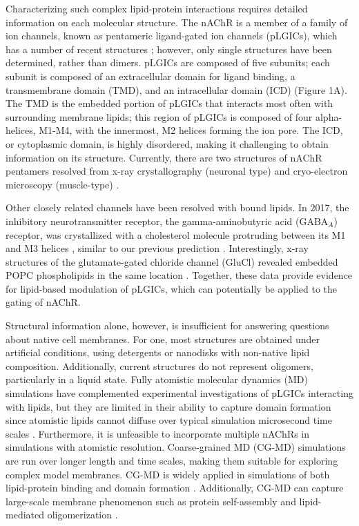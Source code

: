 Characterizing such complex lipid-protein interactions requires detailed information on each molecular structure. The nAChR is a member of a family of ion channels, known as pentameric ligand-gated ion channels (pLGICs), which has a number of recent structures \citep{Laverty2019,Laverty2017,Masiulis2019,Althoff2014,Hibbs2011,Morales2016,Baenziger2011,Corringer2012,S089662731630023X20160504,Prevost2012a,Sauguet2014}; however, only single structures have been determined, rather than dimers. pLGICs are composed of five subunits; each subunit is composed of an extracellular domain for ligand binding, a transmembrane domain (TMD), and an intracellular domain (ICD) (Figure 1A). The TMD is the embedded portion of pLGICs that interacts most often with surrounding membrane lipids; this region of pLGICs is composed of four alpha-helices, M1-M4, with the innermost, M2 helices forming the ion pore. The ICD, or cytoplasmic domain, is highly disordered, making it challenging to obtain information on its structure. Currently, there are two structures of nAChR pentamers resolved from x-ray crystallography (neuronal type) and cryo-electron microscopy (muscle-type) \citep{Morales2016, Unwin2005}.

Other closely related channels have been resolved with bound lipids. In 2017, the inhibitory neurotransmitter receptor, the gamma-aminobutyric acid (GABA$_A$) receptor, was crystallized with a cholesterol molecule protruding between its M1 and M3 helices \citep{Laverty2017}, similar to our previous prediction \citep{Hnin_A_2014}. Interestingly, x-ray structures of the glutamate-gated chloride channel (GluCl) revealed embedded POPC phospholipids in the same location \citep{Althoff2014}. Together, these data provide evidence for lipid-based modulation of pLGICs, which can potentially be applied to the gating of nAChR.

Structural information alone, however, is insufficient for answering questions about native cell membranes. For one, most structures are obtained under artificial conditions, using detergents or nanodisks with non-native lipid composition. Additionally, current structures do not represent oligomers, particularly in a liquid state. Fully atomistic molecular dynamics (MD) simulations \citep{brannigan, Cheng2009, Hnin_A_2014, Carswell_Role_2015} have complemented experimental investigations of pLGICs interacting with lipids, but they are limited in their ability to capture domain formation since atomistic lipids cannot diffuse over typical simulation microsecond time scales \citep{Ingolfsson2014,Bond2006,Parton2013,Goose2013,Scott2008}.  Furthermore, it is unfeasible to incorporate multiple nAChRs in simulations with atomistic resolution. Coarse-grained MD (CG-MD) simulations are run over longer length and time scales, making them suitable for exploring complex model membranes. CG-MD is widely applied in simulations of both lipid-protein binding and domain formation \citep{Bond2006,Scott2008,Parton2013,Goose2013}. Additionally, CG-MD can capture large-scale membrane phenomenon such as protein self-assembly and lipid-mediated oligomerization \citep{10.3389/fphys.2016.00494, BAADEN2013878}.

